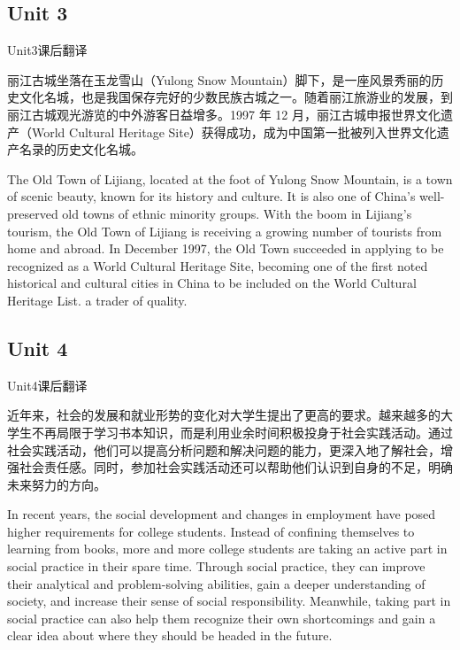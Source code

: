 \subsection{Unit 3}

\begin{question}{Unit3课后翻译}

丽江古城坐落在玉龙雪山（Yulong Snow Mountain）脚下，是一座风景秀丽的历史文化名城，也是我国保存完好的少数民族古城之一。随着丽江旅游业的发展，到丽江古城观光游览的中外游客日益增多。1997 年 12 月，丽江古城申报世界文化遗产（World Cultural Heritage Site）获得成功，成为中国第一批被列入世界文化遗产名录的历史文化名城。

\end{question}

\begin{solution}

The Old Town of Lijiang, located at the foot of Yulong Snow Mountain, is a town of scenic beauty, known for its history and culture. It is also one of China’s well-preserved old towns of ethnic minority groups. With the boom in Lijiang’s tourism, the Old Town of Lijiang is receiving a growing number of tourists from home and abroad. In December 1997, the Old Town succeeded in applying to be recognized as a World Cultural Heritage Site, becoming one of the first noted historical and cultural cities in China to be included on the World Cultural Heritage List.
a trader of quality.

\end{solution}



\subsection{Unit 4}

\begin{question}{Unit4课后翻译}

近年来，社会的发展和就业形势的变化对大学生提出了更高的要求。越来越多的大学生不再局限于学习书本知识，而是利用业余时间积极投身于社会实践活动。通过社会实践活动，他们可以提高分析问题和解决问题的能力，更深入地了解社会，增强社会责任感。同时，参加社会实践活动还可以帮助他们认识到自身的不足，明确未来努力的方向。

\end{question}

In recent years, the social development and changes in employment have posed higher requirements for college students. Instead of confining themselves to learning from books, more and more college students are taking an active part in social practice in their spare time. Through social practice, they can improve their analytical and problem-solving abilities, gain a deeper understanding of society, and increase their sense of social responsibility. Meanwhile, taking part in social practice can also help them recognize their own shortcomings and gain a clear idea about where they should be headed in the future.

